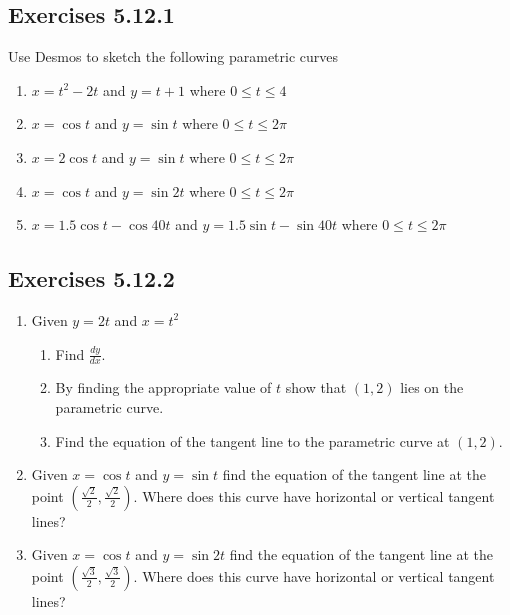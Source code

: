 \subsection{Exercises 5.12.1}
Use Desmos to sketch the following parametric curves 


\begin{enumerate}
	\item $x =t^{2} -2 t$ and $y =t +1$ where $0 \leqslant t \leqslant 4$ 
	
	\item $x =\cos  t$ and $y =\sin  t$ where $0 \leqslant t \leqslant 2 \pi $ 
	
	\item $x =2 \cos  t$ and $y =\sin  t$ where $0 \leqslant t \leqslant 2 \pi $ 
	
	\item $x =\cos  t$ and $y =\sin  2 t$ where $0 \leqslant t \leqslant 2 \pi $ 
	
	\item $x =1.5 \cos  t -\cos  40 t$ and $y =1.5 \sin  t -\sin  40 t$ where $0 \leqslant t \leqslant 2 \pi $ \end{enumerate}




\subsection{Exercises 5.12.2}
\begin{enumerate}
	\item Given $y =2 t$ and $x =t^{2}$ 
	
	
	\begin{enumerate}
		\item Find $\frac{d y}{d x}$. 
		
		\item By finding the appropriate value of $t$ show that $(1 ,2)$ lies on the parametric curve. 
		
		\item Find
		the equation of the tangent line to the parametric curve at $(1 ,2)$. \end{enumerate}
	
	
	\item Given
	$x =\cos  t$ and $y =\sin  t$ find the equation of the tangent line at the point $\left (\frac{\sqrt{2}}{2} ,\frac{\sqrt{2}}{2}\right )$. Where does this curve
	have horizontal or vertical tangent lines? 
	
	\item Given $x =\cos  t$ and $y =\sin  2 t$ find the equation of the tangent line at the point $\left (\frac{\sqrt{3}}{2} ,\frac{\sqrt{3}}{2}\right )$. Where does this curve
	have horizontal or vertical tangent lines? \end{enumerate}


